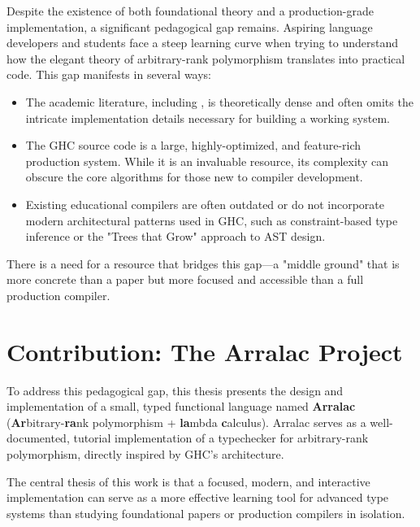 Despite the existence of both foundational theory and a production-grade implementation, a significant pedagogical gap remains. Aspiring language developers and students face a steep learning curve when trying to understand how the elegant theory of arbitrary-rank polymorphism translates into practical code. This gap manifests in several ways:
\begin{itemize}
    \item The academic literature, including \cite{jones-practical-2007}, is theoretically dense and often omits the intricate implementation details necessary for building a working system.
    \item The GHC source code is a large, highly-optimized, and feature-rich production system. While it is an invaluable resource, its complexity can obscure the core algorithms for those new to compiler development.
    \item Existing educational compilers are often outdated or do not incorporate modern architectural patterns used in GHC, such as constraint-based type inference or the "Trees that Grow" approach to AST design.
\end{itemize}
There is a need for a resource that bridges this gap---a "middle ground" that is more concrete than a paper but more focused and accessible than a full production compiler.

\section{Contribution: The Arralac Project}

To address this pedagogical gap, this thesis presents the design and implementation of a small, typed functional language named \textbf{Arralac} (\textbf{Ar}bitrary-\textbf{ra}nk polymorphism + \textbf{la}mbda \textbf{c}alculus). Arralac serves as a well-documented, tutorial implementation of a typechecker for arbitrary-rank polymorphism, directly inspired by GHC's architecture.

The central thesis of this work is that a focused, modern, and interactive implementation can serve as a more effective learning tool for advanced type systems than studying foundational papers or production compilers in isolation.

